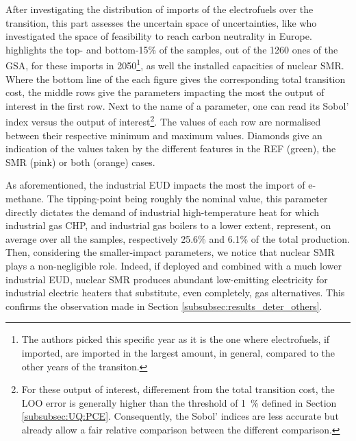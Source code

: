 \documentclass[11pt,twoside,a4paper,english]{article}
\begin{document}
After investigating the distribution of imports of the electrofuels over the transition, this part assesses the uncertain space of uncertainties, like \citet{pickering2022diversity} who investigated the space of feasibility to reach carbon neutrality in Europe.  highlights the top- and bottom-15\% of the samples, out of the 1260 ones of the \gls{GSA}, for these imports in 2050\footnote{The authors picked this specific year as it is the one where electrofuels, if imported, are imported in the largest amount, in general, compared to the other years of the transiton.}, as well the installed capacities of nuclear SMR. Where the bottom line of the each figure gives the corresponding total transition cost, the middle rows give the parameters impacting the most the output of interest in the first row. Next to the name of a parameter, one can read its Sobol' index versus the output of interest\footnote{For these output of interest, differement from the total transition cost, the \gls{LOO} error is generally higher than the threshold of \SI{1}{\%} defined in Section \ref{subsubsec:UQ:PCE}. Consequently, the Sobol' indices are less accurate but already allow a fair relative comparison between the different comparison.}. The values of each row are normalised between their respective minimum and maximum values. Diamonds give an indication of the values taken by the different features in the REF (green), the SMR (pink) or both (orange) cases.

As aforementioned, the industrial \gls{EUD} impacts the most the import of e-methane. The tipping-point being roughly the nominal value, this parameter directly dictates the demand of industrial high-temperature heat for which industrial gas \gls{CHP}, and industrial gas boilers to a lower extent, represent, on average over all the samples, respectively 25.6\% and 6.1\% of the total production. Then, considering the smaller-impact parameters, we notice that nuclear SMR plays a non-negligible role. Indeed, if deployed and combined with a much lower industrial \gls{EUD}, nuclear SMR produces abundant low-emitting electricity for industrial electric heaters that substitute, even completely, gas alternatives. This confirms the observation made in Section \ref{subsubsec:results_deter_others}. 
\end{document}
